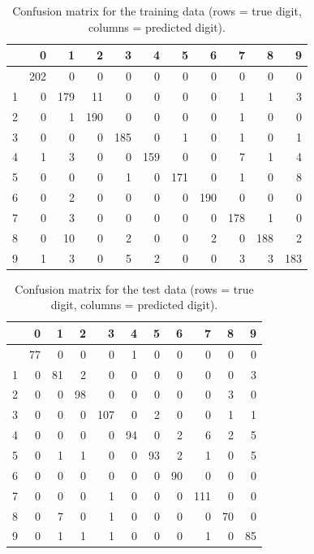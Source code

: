 \documentclass[
  english,
  11pt,
]{article}
\begin{document}
\begin{longtable}[]{@{}lrrrrrrrrrr@{}}

\caption{\label{tbl-a1-cm-train}Confusion matrix for the training data
(rows = true digit, columns = predicted digit).}

\tabularnewline

\toprule\noalign{}
& 0 & 1 & 2 & 3 & 4 & 5 & 6 & 7 & 8 & 9 \\
\midrule\noalign{}
\endhead
\bottomrule\noalign{}
\endlastfoot
0 & 202 & 0 & 0 & 0 & 0 & 0 & 0 & 0 & 0 & 0 \\
1 & 0 & 179 & 11 & 0 & 0 & 0 & 0 & 1 & 1 & 3 \\
2 & 0 & 1 & 190 & 0 & 0 & 0 & 0 & 1 & 0 & 0 \\
3 & 0 & 0 & 0 & 185 & 0 & 1 & 0 & 1 & 0 & 1 \\
4 & 1 & 3 & 0 & 0 & 159 & 0 & 0 & 7 & 1 & 4 \\
5 & 0 & 0 & 0 & 1 & 0 & 171 & 0 & 1 & 0 & 8 \\
6 & 0 & 2 & 0 & 0 & 0 & 0 & 190 & 0 & 0 & 0 \\
7 & 0 & 3 & 0 & 0 & 0 & 0 & 0 & 178 & 1 & 0 \\
8 & 0 & 10 & 0 & 2 & 0 & 0 & 2 & 0 & 188 & 2 \\
9 & 1 & 3 & 0 & 5 & 2 & 0 & 0 & 3 & 3 & 183 \\

\end{longtable}

\begin{longtable}[]{@{}lrrrrrrrrrr@{}}

\caption{\label{tbl-a1-cm-test}Confusion matrix for the test data (rows
= true digit, columns = predicted digit).}

\tabularnewline

\toprule\noalign{}
& 0 & 1 & 2 & 3 & 4 & 5 & 6 & 7 & 8 & 9 \\
\midrule\noalign{}
\endhead
\bottomrule\noalign{}
\endlastfoot
0 & 77 & 0 & 0 & 0 & 1 & 0 & 0 & 0 & 0 & 0 \\
1 & 0 & 81 & 2 & 0 & 0 & 0 & 0 & 0 & 0 & 3 \\
2 & 0 & 0 & 98 & 0 & 0 & 0 & 0 & 0 & 3 & 0 \\
3 & 0 & 0 & 0 & 107 & 0 & 2 & 0 & 0 & 1 & 1 \\
4 & 0 & 0 & 0 & 0 & 94 & 0 & 2 & 6 & 2 & 5 \\
5 & 0 & 1 & 1 & 0 & 0 & 93 & 2 & 1 & 0 & 5 \\
6 & 0 & 0 & 0 & 0 & 0 & 0 & 90 & 0 & 0 & 0 \\
7 & 0 & 0 & 0 & 1 & 0 & 0 & 0 & 111 & 0 & 0 \\
8 & 0 & 7 & 0 & 1 & 0 & 0 & 0 & 0 & 70 & 0 \\
9 & 0 & 1 & 1 & 1 & 0 & 0 & 0 & 1 & 0 & 85 \\

\end{longtable}
\end{document}
